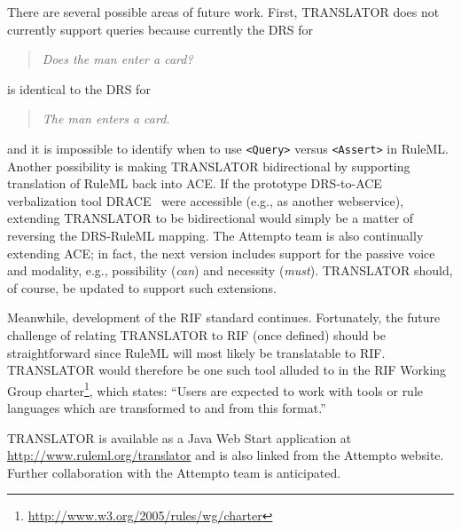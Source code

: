 \documentclass[12pt]{article}
\begin{document}
There are several possible areas of future work. First, TRANSLATOR does not currently support queries because currently the DRS for
\begin{quote}
\textit{Does the man enter a card?}
\end{quote}
is identical to the DRS for
\begin{quote}
\textit{The man enters a card.}
\end{quote}
and it is impossible to identify when to use \verb|<Query>| versus \verb|<Assert>| in RuleML. Another possibility is making TRANSLATOR bidirectional by supporting translation of RuleML back into ACE. If the prototype DRS-to-ACE verbalization tool DRACE~\cite{verbal} were accessible (e.g., as another webservice), extending TRANSLATOR to be bidirectional would simply be a matter of reversing the DRS-RuleML mapping. The Attempto team is also continually extending ACE; in fact, the next version includes support for the passive voice and modality, e.g., possibility (\textit{can}) and necessity (\textit{must}). TRANSLATOR should, of course, be updated to support such extensions.

Meanwhile, development of the RIF standard continues. Fortunately, the future challenge of relating TRANSLATOR to RIF (once defined) should be straightforward since RuleML will most likely be translatable to RIF. TRANSLATOR would therefore be one such tool alluded to in the RIF Working Group charter\footnote{\url{http://www.w3.org/2005/rules/wg/charter}}, which states: ``Users are expected to work with tools or rule languages which are transformed to and from this format.''

TRANSLATOR is available as a Java Web Start application at \url{http://www.ruleml.org/translator} and is also linked from the Attempto website. Further collaboration with the Attempto team is anticipated.
\newpage



\end{document}
